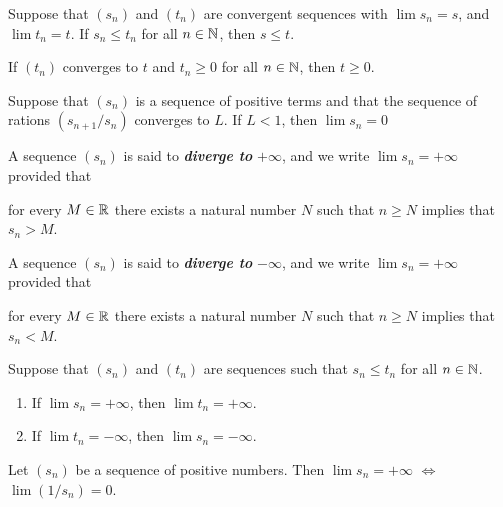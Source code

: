 \documentclass[12pt]{article}
\begin{document}
\begin{definition}
  Suppose that $(s_n)$ and $(t_n)$ are convergent sequences with $\lim{s_n} =
  s$, and $\lim{t_n} = t$. If $s_n \le t_n$ for all $n \in \mathbb{N}$, then $s
  \le t$.
\end{definition}

\begin{corollary}
  If $(t_n)$ converges to $t$ and $t_n \ge 0$ for all $n \in \mathbb{N}$, then $t
  \ge 0$.
\end{corollary}

\begin{definition}
  Suppose that $(s_n)$ is a sequence of positive terms and that the sequence of
  rations $(s_{n+1} / s_n)$ converges to $L$. If $L < 1$, then $\lim{s_n} = 0$
\end{definition}

\begin{definition}[Divergence]
  A sequence $(s_n)$ is said to \textit{\textbf{diverge to}} $+\infty$, and we
  write $\lim{s_n} = +\infty$ provided that
  \begin{center}
    for every $M \in \mathbb{R}$ there exists a natural number $N$ such that $n \ge
    N$ implies that $s_n > M$.
  \end{center}

  A sequence $(s_n)$ is said to \textit{\textbf{diverge to}} $-\infty$, and we
  write $\lim{s_n} = +\infty$ provided that
  \begin{center}
    for every $M \in \mathbb{R}$ there exists a natural number $N$ such that $n \ge
    N$ implies that $s_n < M$.
  \end{center}
\end{definition}

\begin{definition}
  Suppose that $(s_n)$ and $(t_n)$ are sequences such that $s_n \le t_n$ for all
  $n \in \mathbb{N}$.
  \begin{enumerate}
    \item If $\lim{s_n} = +\infty$, then $\lim{t_n} = +\infty$.
    \item If $\lim{t_n} = -\infty$, then $\lim{s_n} = -\infty$.
  \end{enumerate}
\end{definition}

\begin{definition}
Let $(s_n)$ be a sequence of positive numbers. Then $\lim{s_n} = +\infty$ $\iff$
$\lim{(1/s_n)} = 0$.
\end{definition}
\end{document}

